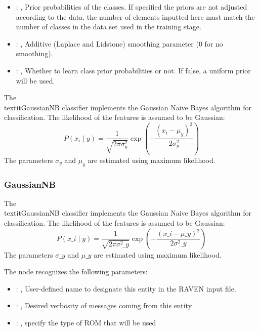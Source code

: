 \begin{itemize}
    \item {}: , 
      Prior probabilities of the classes. If specified the priors are
      not adjusted according to the data. \nb the number of elements inputted here must
      match the number of classes in the data set used in the training stage.

    \item {}: , 
      Additive (Laplace and Lidstone) smoothing parameter (0 for no smoothing).

    \item {}: , 
      Whether to learn class prior probabilities or not. If false, a uniform
      prior will be used.
  \end{itemize}
 The \\textit{GaussianNB} classifier implements the Gaussian Naive Bayes
 algorithm for classification.                          The likelihood of the features is assumed to
 be Gaussian:                          \begin{equation}                              P(x_i \mid y) =
 \frac{1}{\sqrt{2\pi\sigma^2_y}} \exp\left(-\frac{(x_i -
 \mu_y)^2}{2\sigma^2_y}\right)                          \end{equation}                          The
 parameters $\sigma_y$ and $\mu_y$ are estimated using maximum likelihood.

\subsubsection{GaussianNB}
  The \\textit{GaussianNB} classifier implements the Gaussian Naive Bayes
  algorithm for classification.                          The likelihood of the features is assumed
  to be Gaussian:                          \begin{equation}                              P(x\_i \mid
  y) = \frac{1}{\sqrt{2\pi\sigma^2\_y}} \exp\left(-\frac{(x\_i -
  \mu\_y)^2}{2\sigma^2\_y}\right)                          \end{equation}                          The
  parameters $\sigma\_y$ and $\mu\_y$ are estimated using maximum likelihood.

  The  node recognizes the following parameters:
    \begin{itemize}
      \item {}: , 
        User-defined name to designate this entity in the RAVEN input file.
      \item {}: , 
        Desired verbosity of messages coming from this entity
      \item {}: , 
        specify the type of ROM that will be used
  \end{itemize}

